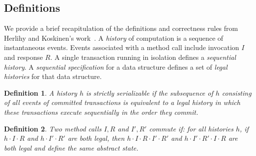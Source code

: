 \documentclass{sig-alternate-05-2015}
\newtheorem{definition}{Definition}
\begin{document}
\subsection{Definitions}
We provide a brief recapitulation of the definitions and correctness rules from Herlihy and Koskinen's work~\cite{herlihy2008transactional}.
A \emph{history} of computation is a sequence of instantaneous events.
Events associated with a method call include invocation $I$ and response $R$.
A single transaction running in isolation defines a \emph{sequential history}.
A \emph{sequential specification} for a data structure defines a set of \emph{legal histories} for that data structure.

\begin{definition}
    A history $h$ is strictly serializable if the subsequence of $h$ consisting of all events of committed transactions is equivalent to a legal history in which these transactions execute sequentially in the order they commit.
\end{definition}



\begin{definition}
    Two method calls $I,R$ and $I',R'$ commute if: for all histories $h$, if $h \cdot I \cdot R$ and $h \cdot I' \cdot R'$ are both legal, then $h \cdot I \cdot R \cdot I' \cdot R'$ and $h \cdot I' \cdot R' \cdot I \cdot R$ are both legal and define the same abstract state.
\end{definition}
\end{document}
